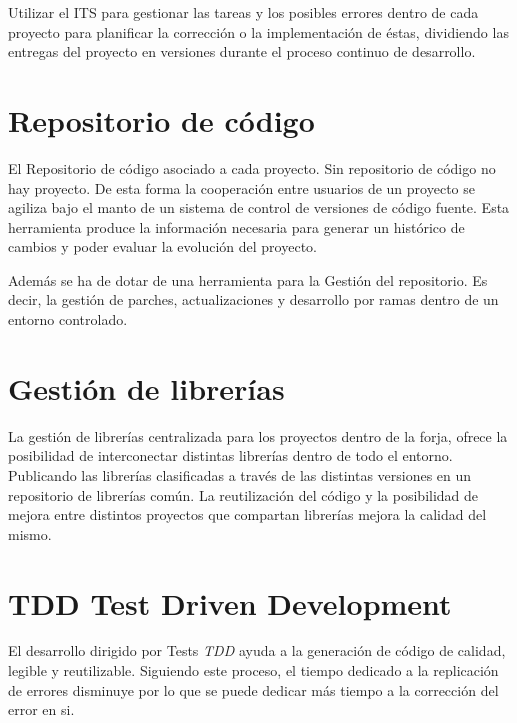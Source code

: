 \par Utilizar el ITS para gestionar las tareas y los posibles errores dentro de cada proyecto para planificar la corrección o la implementación de éstas, dividiendo las entregas del proyecto en versiones durante el proceso continuo de desarrollo.


\section{Repositorio de código}
\label{sec:repositorio-codigo}

\par El Repositorio de c\'odigo asociado a cada proyecto. Sin repositorio de código no hay proyecto. De esta forma la cooperación entre usuarios de un proyecto se agiliza bajo el manto de un sistema de control de versiones de código fuente. Esta herramienta produce la información necesaria para generar un histórico de cambios y poder evaluar la evolución del proyecto.

\par Además se ha de dotar de una herramienta para la Gesti\'on del repositorio. Es decir, la gestión de parches, actualizaciones y desarrollo por ramas dentro de un entorno controlado.


\section{Gestión de librerías}
\label{sec:gestion-librerias}

\par La gesti\'on de librer\'ias centralizada para los proyectos dentro de la forja, ofrece la posibilidad de interconectar distintas librerías dentro de todo el entorno. Publicando las librerías clasificadas a través de las distintas versiones en un repositorio de librerías común. La reutilización del código y la posibilidad de mejora entre distintos proyectos que compartan librerías mejora la calidad del mismo.


\section{TDD Test Driven Development}
\label{sec:tdd}

\par El desarrollo dirigido por Tests \emph{TDD} ayuda a la generación de código de calidad, legible y reutilizable. Siguiendo este proceso, el tiempo dedicado a la replicación de errores disminuye por lo que se puede dedicar más tiempo a la corrección del error en si.

